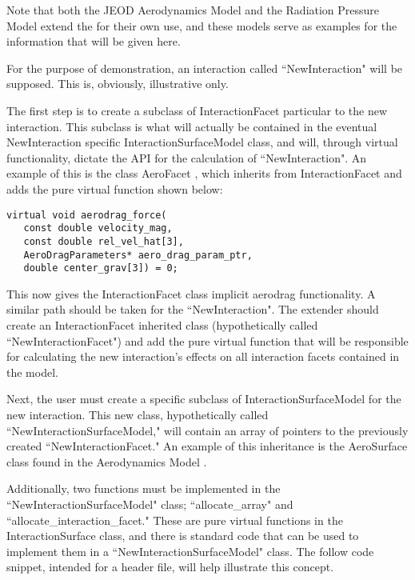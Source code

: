 Note that both the JEOD Aerodynamics Model \cite{dynenv:AERODYNAMICS} and the
Radiation Pressure Model \cite{dynenv:RADIATIONPRESSURE} extend the
\ModelDesc for their own use, and these models serve as examples
for the information that will be given here.

For the purpose of demonstration, an interaction called ``NewInteraction" will
be supposed. This is, obviously, illustrative only.

The first step is to create a subclass of InteractionFacet particular to the
new interaction. This subclass is what will actually be contained
in the eventual NewInteraction specific InteractionSurfaceModel class, and
will, through virtual functionality, dictate the API for the calculation
of ``NewInteraction". An example of this is the class AeroFacet
\cite{dynenv:AERODYNAMICS}, which inherits from InteractionFacet and adds
the pure virtual function shown below:

\begin{verbatim}
virtual void aerodrag_force(
   const double velocity_mag,
   const double rel_vel_hat[3],
   AeroDragParameters* aero_drag_param_ptr,
   double center_grav[3]) = 0;
\end{verbatim}

This now gives the InteractionFacet class implicit aerodrag functionality.
A similar path should be taken for the ``NewInteraction". The extender
should create an InteractionFacet inherited class (hypothetically called
``NewInteractionFacet") and add the pure virtual
function that will be responsible for calculating the new interaction's effects
on all interaction facets contained in the model.

Next, the user must create a specific subclass of InteractionSurfaceModel
for the new interaction. This new class, hypothetically called
``NewInteractionSurfaceModel," will contain an array of pointers to the
previously created ``NewInteractionFacet." An example of this
inheritance is the AeroSurface class found in the Aerodynamics Model
\cite{dynenv:AERODYNAMICS}.

Additionally, two functions must be implemented in the
``NewInteractionSurfaceModel" class; ``allocate\_array" and
``allocate\_interaction\_facet." These are pure virtual functions
in the InteractionSurface class, and there is standard code that can
be used to implement them in a ``NewInteractionSurfaceModel" class.
The follow code snippet, intended for a header file, will help illustrate
this concept.

